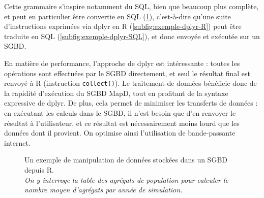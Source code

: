 Cette grammaire s'inspire notamment du SQL, bien que beaucoup plus complète, et peut en particulier être convertie en SQL (\cref{fig:dml-simedb}), c'est-à-dire qu'une suite d'instructions exprimées via \textsf{dplyr} en \textsf{R} (\cref{subfig:exemple-dplyr-R}) peut être traduite en SQL (\cref{subfig:exemple-dplyr-SQL}), et donc envoyée et exécutée sur un SGBD.

En matière de performance, l'approche de \textsf{dplyr} est intéressante : toutes les opérations sont effectuées par le SGBD directement, et seul le résultat final est renvoyé à \textsf{R} (instruction \texttt{collect()}).
Le traitement de données bénéficie donc de la rapidité d'exécution du SGBD MapD, tout en profitant de la syntaxe expressive de \textsf{dplyr}.
De plus, cela permet de minimiser les transferts de données : en exécutant les calculs dans le SGBD, il n'est besoin que d'en renvoyer le résultat à l'utilisateur, et ce résultat est nécessairement moins lourd que les données dont il provient.
On optimise ainsi l'utilisation de bande-passante internet.

\begin{figure}[H]
	\centering
	\hspace{5pt}
	\vspace{-0.3cm}
	\vspace{-0.3cm}
	\caption[Un exemple de manipulation de données stockées dans un SGBD depuis \textsf{R}.]{Un exemple de manipulation de données stockées dans un SGBD depuis \textsf{R}.\\
	\textit{On y interroge la table des agrégats de population pour calculer le nombre moyen d'agrégats par année de simulation.}}
	\label{fig:dml-simedb}
\end{figure}


